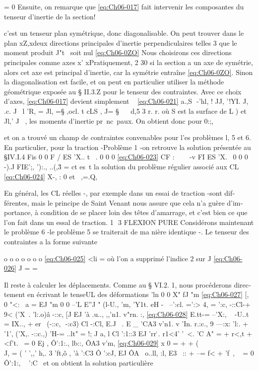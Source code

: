 = 0 
Ensuite, on remarque que \eqref{eq:Ch06-017} fait intervenir les composantes du tenseur d'inertie de la section! 


c'est un tenseur plan symétrique, donc diagonalisable. On peut trouver dans le plan xZ,xdeux directions principales d'inertie perpendiculaires telles
3 que le moment produit J"t~ soit nul 
\eqref{eq:Ch06-0ZO} 
Nous choisirons ces directions principales comme axes x' xPratiquement,
2 30 
si la section a un axe de symétrie, alors cet axe est principal d'inertie, 
car la symétrie entraîne \eqref{eq:Ch06-0ZO}. Sinon la diagonalisation est facile, et on peut en particulier utiliser la méthode géométrique exposée au § II.3.Z pour 
le tenseur des contraintes. 
Avec ce choix d'axes, \eqref{eq:Ch06-017} devient simplement 
~
\eqref{eq:Ch06-021} a.,S  -'hl, ! JJ, '!YI. J, ~ .c. J~
l 
'R, = 
Jl, =§ ,ocl. t cLS , J= § ~~ d,5
3 
r. r. 
où S est la surface de L ) et Jl,' J~ , les moments d'inertie pr~nc~paux. 
On obtient donc pour 0:;, 

et on a trouvé un champ de contraintes convenables pour l'es problèmes l, 5 et 6. 
En particulier, pour la traction -Problème 1 -on retrouve la solution 
présentée au §IV.I.4 
Fis 0 0 
F / ES 'X..
t~ .
0 0 0
\eqref{eq:Ch06-023} CF : 
~~~ -v FI ES 'X.~ 0 0 0 
-).J FIE';, '):.,
..(,\.3 = 
ct es~t la solution du problème régulier associé aux CL 
\eqref{eq:Ch06-024} X-, : 0 et ~,=.Q, 

En général, les CL réelles -, par exemple dans un essai de traction -sont dif­
férentes, mais le principe de Saint Venant nous assure que cela n'a guère d'im­portance, à condition de se placer loin des têtes d'amarrage, et c'est bien ce que l'on fait dans un essal de traction. 
1  3 FLEXION PURE 
Considérons maintenant le problème 6 -le problème 5 se traiterait de ma­
nière identique -. Le tenseur des contraintes a la forme suivante 

o o 
o o o o o 
\eqref{eq:Ch06-025} <li = 
où l'on a supprimé l'indice 2 sur J 
\eqref{eq:Ch06-026} J = 
= 

Il reste à calculer les déplacements. Comme au § VI.2. 1, nous procéderons direc­tement en écrivant le tenseUL des déformations 
'ln 
0 0
X"
fJ "m
\eqref{eq:Ch06-027} [, 
0 "<:~ a
= 
EJ "m
0 0 --'L E''J " 
(l-U., 'm, 
'Y1t. 
eH -~ --':cl. =':> 4, = ':c, -::Cl-+ 9< ('X~. 'l:.o)â -::c, [J EJ 
'à .u.., ,,'n1. v"rn. :,
\eqref{eq:Ch06-028} 
E.tt-= --'X:, ~ -U..t = IX.., + er~ (-::c,  -:c3) Cl -:Cl, E.J ~. 
E _ 'CA3 v'n1. v 'In. 
r.:c., 9 ---:x: 'l:. + '1', ('X,. -::c.,)
'H-= ..lt" = 
!; J a, l
Cl ':1::3 EJ 'rr\..
r1<4' '~<. 'C A" = + r<,t + <f't.~ = 0
Ej ,
Ô':1:., lb::, 
ÔA3 v'm,
\eqref{eq:Ch06-029} x 0
= + + (\\ J, =
( ' ',,' h,. 3 'ft,ô ,
'à ':C3 Ô ':cJ, EJ 
ÔA~ o..ll,
:l, E3~ :: + --= f< + 'f~, ~ = 0 Ô':1:, ~ ':C~ 
et on obtient la solution particulière 

